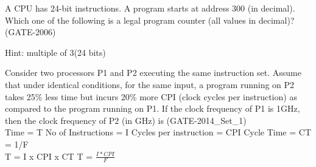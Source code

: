 \begin{questyle}
  \question  A CPU has 24-bit instructions. A program starts at address 300 (in decimal). Which one
             of the following is a legal program counter (all values in decimal)?  (GATE-2006)

  \begin{oneparchoices}
          \qquad Hint: multiple of 3(24 bits)
  \end{oneparchoices}
\end{questyle}

\begin{questyle}
  \question  Consider two processors P1 and P2 executing the same instruction set. Assume that under
             identical conditions, for the same input, a program running on P2 takes 25\% less time but
             incurs 20\% more CPI (clock cycles per instruction) as compared to the program
             running on P1. If the clock frequency of P1 is 1GHz, then the clock frequency of
             P2 (in GHz) is \fillin[1.6]  (GATE-2014\_Set\_1)
             \\ Time = T \quad No of Instructions = I \quad Cycles per instruction = CPI \quad Cycle Time = CT = 1/F
             \\ T = I x CPI x CT  \qquad  T = { \Large \( \frac{I * CPI}{F}  \) }
\end{questyle}


